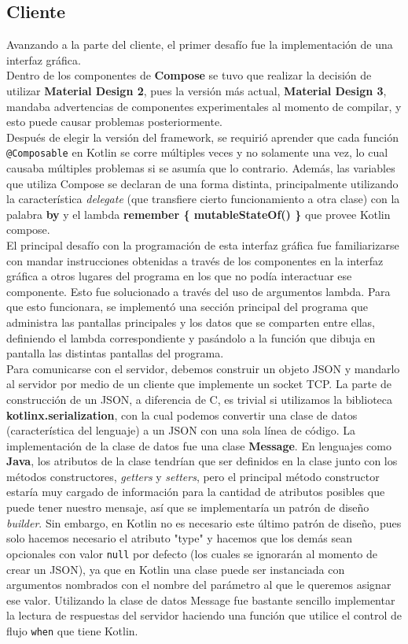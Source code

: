 \documentclass[12pt,a4paper]{article}
\begin{document}
\subsection{Cliente}
Avanzando a la parte del cliente, el primer desafío fue la implementación de una interfaz gráfica.  \\
Dentro de los componentes de \textbf{Compose} se tuvo que realizar la decisión de utilizar \textbf{Material Design 2}, pues la versión más actual, \textbf{Material Design 3}, mandaba advertencias de componentes experimentales al momento de compilar, y esto puede causar problemas posteriormente. \\
Después de elegir la versión del framework, se requirió aprender que cada función \texttt{@Composable} en Kotlin se corre múltiples veces y no solamente una vez, lo cual causaba múltiples problemas si se asumía que lo contrario. Además, las variables que utiliza Compose se declaran de una forma distinta, principalmente utilizando la característica \textit{delegate} (que transfiere cierto funcionamiento a otra clase) con la palabra \textbf{by} y el lambda \textbf{remember \{ mutableStateOf() \}} que provee Kotlin compose. \\
El principal desafío con la programación de esta interfaz gráfica fue familiarizarse con mandar instrucciones obtenidas a través de los componentes en la interfaz gráfica a otros lugares del programa en los que no podía interactuar ese componente. Esto fue solucionado a través del uso de argumentos lambda. Para que esto funcionara, se implementó una sección principal del programa que administra las pantallas principales y los datos que se comparten entre ellas, definiendo el lambda correspondiente y pasándolo a la función que dibuja en pantalla las distintas pantallas del programa. \\
Para comunicarse con el servidor, debemos construir un objeto JSON y mandarlo al servidor por medio de un cliente que implemente un socket TCP. La parte de construcción de un JSON, a diferencia de C, es trivial si utilizamos la biblioteca \textbf{kotlinx.serialization}, con la cual podemos convertir una clase de datos (característica del lenguaje) a un JSON con una sola línea de código. La implementación de la clase de datos fue una clase \textbf{Message}. En lenguajes como \textbf{Java}, los atributos de la clase tendrían que ser definidos en la clase junto con los métodos constructores, \textit{getters} y \textit{setters}, pero el principal método constructor estaría muy cargado de información para la cantidad de atributos posibles que puede tener nuestro mensaje, así que se implementaría un patrón de diseño \textit{builder}. Sin embargo, en Kotlin no es necesario este último patrón de diseño, pues solo hacemos necesario el atributo "type" y hacemos que los demás sean opcionales con valor \texttt{null} por defecto (los cuales se ignorarán al momento de crear un JSON), ya que en Kotlin una clase puede ser instanciada con argumentos nombrados con el nombre del parámetro al que le queremos asignar ese valor. Utilizando la clase de datos Message fue bastante sencillo implementar la lectura de respuestas del servidor haciendo una función que utilice el control de flujo \texttt{when} que tiene Kotlin. \\
\end{document}
